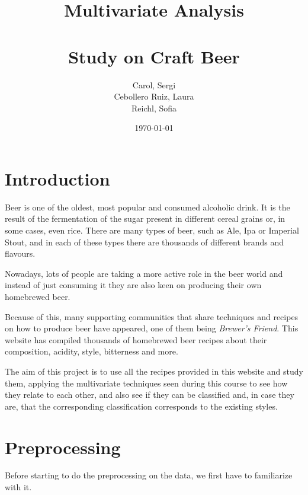 
%


\title{ \Large Multivariate Analysis \\~\\  \huge \textbf{Study on Craft Beer}}
\author{Carol, Sergi \\ Cebollero Ruiz, Laura \\ Reichl, Sofia}
\date{\today}



\maketitle


\tableofcontents

\newpage
\section{Introduction}
Beer is one of the oldest, most popular and consumed alcoholic drink. It is the result of the fermentation of the sugar present in different cereal grains or, in some cases, even rice. There are many types of beer, such as Ale, Ipa or Imperial Stout, and in each of these types there are thousands of different brands and flavours.

Nowadays, lots of people are taking a more active role in the beer world and instead of just consuming it they are also keen on producing their own homebrewed beer. 

Because of this, many supporting communities that share techniques and recipes on how to produce beer have appeared, one of them being \textit{Brewer's Friend}. This website has compiled thousands of homebrewed beer recipes about their composition, acidity, style, bitterness and more.

The aim of this project is to use all the recipes provided in this website and study them, applying the multivariate techniques seen during this course to see how they relate to each other, and also see if they can be classified and, in case they are, that the corresponding classification corresponds to the existing styles.

\section{Preprocessing}

Before starting to do the preprocessing on the data, we first have to familiarize with it.

